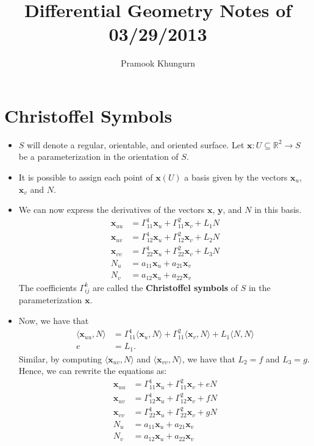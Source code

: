 \documentclass[10pt]{article}
\title{Differential Geometry Notes of 03/29/2013}
\author{Pramook Khungurn}
\newcommand{\ve}[1]{\mathbf{#1}}
\newcommand{\ra}{\rightarrow}
\newcommand{\Real}{\mathbb{R}}
\newcommand{\sseq}{\subseteq}
\begin{document}
  \maketitle

  \section{Christoffel Symbols}

  \begin{itemize}
    \item $S$ will denote a regular, orientable, and oriented surface. Let $\ve{x} : U \sseq \Real^2 \ra S$ be a parameterization in the orientation of $S$.

    \item It is possible to assign each point of $\ve{x}(U)$ a basis given by the vectors $\ve{x}_u$, $\ve{x}_v$ and $N$.

    \item We can now express the derivatives of the vectors $\ve{x}$, $\ve{y}$, and $N$ in this basis.
    \begin{align*}
      \ve{x}_{uu} &= \Gamma_{11}^1 \ve{x}_u + \Gamma_{11}^2\ve{x}_v + L_1 N\\
      \ve{x}_{uv} &= \Gamma_{12}^1 \ve{x}_u + \Gamma_{12}^2\ve{x}_v + L_2 N\\
      \ve{x}_{vv} &= \Gamma_{22}^1 \ve{x}_u + \Gamma_{22}^2\ve{x}_v + L_3 N\\
      N_u &= a_{11} \ve{x}_u + a_{21} \ve{x}_v\\
      N_v &= a_{12} \ve{x}_u + a_{22} \ve{x}_v
    \end{align*}
    The coefficients $\Gamma_{ij}^k$ are  called the {\bf Christoffel symbols} of $S$ in the parameterization $\ve{x}$.

    \item Now, we have that
    \begin{align*}
      \langle \ve{x}_{uu}, N \rangle &= \Gamma_{11}^1 \langle \ve{x}_u, N \rangle + \Gamma_{11}^2 \langle \ve{x}_v, N \rangle + L_1 \langle N, N \rangle\\
      e &= L_1.
    \end{align*}
    Similar, by computing $\langle \ve{x}_{uv}, N \rangle$ and $\langle \ve{x}_{vv}, N \rangle$, we have that $L_2 = f$ and $L_3 = g$. Hence, we can rewrite the equations as:
    \begin{align*}
      \ve{x}_{uu} &= \Gamma_{11}^1 \ve{x}_u + \Gamma_{11}^2\ve{x}_v + e N\\
      \ve{x}_{uv} &= \Gamma_{12}^1 \ve{x}_u + \Gamma_{12}^2\ve{x}_v + f N\\
      \ve{x}_{vv} &= \Gamma_{22}^1 \ve{x}_u + \Gamma_{22}^2\ve{x}_v + g N\\
      N_u &= a_{11} \ve{x}_u + a_{21} \ve{x}_v\\
      N_v &= a_{12} \ve{x}_u + a_{22} \ve{x}_v
    \end{align*}


\end{itemize}
\end{document}
